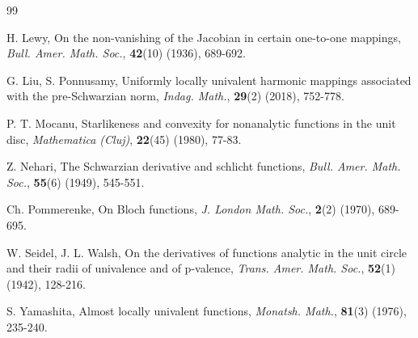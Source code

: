 \documentclass[a4paper,12pt]{amsart}
\theoremstyle{definition}
\begin{document}
\begin{thebibliography}{99}
		
	{\sc H. Lewy}, On the non-vanishing of the Jacobian in certain one-to-one mappings, {\it Bull. Amer. Math. Soc.}, {\bf 42}(10) (1936), 689-692.	
		
		
		{\sc G. Liu, S. Ponnusamy}, Uniformly locally univalent harmonic mappings associated with the pre-Schwarzian norm, {\it Indag. Math.}, {\bf 29}(2) (2018), 752-778.
		
		
		
		{\sc P. T. Mocanu}, Starlikeness and convexity for nonanalytic functions in the unit disc, {\it Mathematica (Cluj)}, {\bf 22}(45) (1980), 77-83.
		
		
		
		
		{\sc Z. Nehari}, The Schwarzian derivative and schlicht functions, {\it Bull. Amer. Math. Soc.}, {\bf 55}(6) (1949), 545-551.
		
		
		{\sc Ch. Pommerenke}, On Bloch functions, {\it J. London Math. Soc.}, {\bf 2}(2) (1970), 689-695.
		
		
		{\sc W. Seidel, J. L. Walsh}, On the derivatives of functions analytic in the unit circle and their radii of univalence and of p-valence, {\it Trans. Amer. Math. Soc.}, {\bf 52}(1) (1942), 128-216.
		
		
		
		
		
		{\sc S. Yamashita}, Almost locally univalent functions, \textit{Monatsh. Math.}, {\bf 81}(3) (1976), 235-240.
		

\end{thebibliography}
\end{document}
